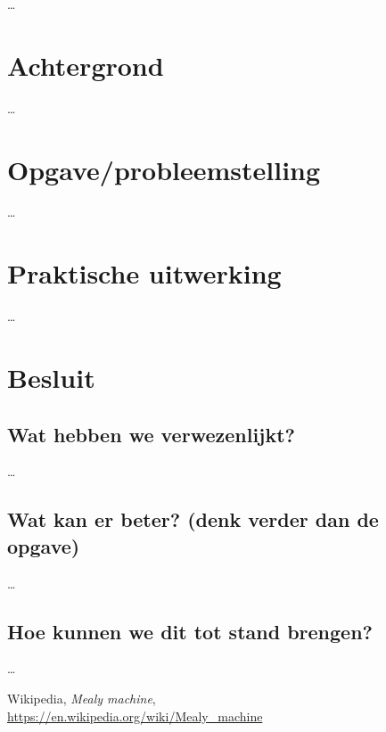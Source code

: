 \documentclass[11pt,a4paper,twoside]{article} %
\begin{document}
\dots

\clearpage


\section{Achtergrond}

\dots

\clearpage


\section{Opgave/probleemstelling}

\dots

\clearpage


\section{Praktische uitwerking}

\dots

\clearpage
			
			
			
\section{Besluit}

\subsection{Wat hebben we verwezenlijkt?}

\dots


\subsection{Wat kan er beter? (denk verder dan de opgave)}

\dots


\subsection{Hoe kunnen we dit tot stand brengen?}

\dots

\clearpage
						
			
\begin{thebibliography}{9} %
	 Wikipedia, \textit{Mealy machine}, \\
	\url{https://en.wikipedia.org/wiki/Mealy_machine}

\end{thebibliography}

	
\end{document}
